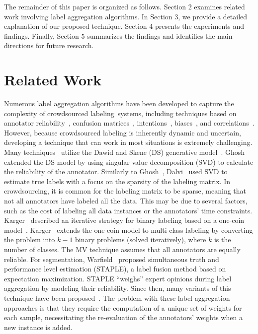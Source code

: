 The remainder of this paper is organized as follows. Section 2 examines related work involving label aggregation algorithms. In Section 3, we provide a detailed explanation of our proposed technique. Section 4 presents the experiments and findings. Finally, Section 5 summarizes the findings and identifies the main directions for future research.

\section{Related Work}
Numerous label aggregation algorithms have been developed to capture the complexity of crowdsourced labeling~systems, including techniques based on annotator reliability~\cite{bi_Learning_2014,demartini_Zencrowd_2012}, confusion matrices~\cite{raykar_Learning_2010,zhang_Spectral_2014}, intentions~\cite{bi_Learning_2014,kurve_MultiCategory_2015}, biases~\cite{zhang_Imbalanced_2013,hernandez-gonzalez_Note_2019, welinder_Multidimensional_2010}, and correlations~\cite{ma_Gradient_2020}. However, because crowdsourced labeling is inherently dynamic and uncertain, developing a technique that can work in most situations is extremely challenging. Many techniques~\cite{liu_Variational_2012,karger_Budget_2014,raykar_Learning_2010,dalvi_Aggregating_2013,ghosh_Who_2011} utilize the Dawid and Skene (DS) generative model~\cite{dawid_Maximum_1979}. Ghosh~\cite{ghosh_Who_2011} extended the DS model by using singular value decomposition (SVD) to calculate the reliability of the annotator. Similarly to Ghosh~\cite{ghosh_Who_2011}, Dalvi~\cite{dalvi_Aggregating_2013} used SVD to estimate true labels with a focus on the sparsity of the labeling matrix. In crowdsourcing, it is common for the labeling matrix to be sparse, meaning that not all annotators have labeled all the data. This may be due to several factors, such as the cost of labeling all data instances or the annotators' time constraints. Karger~\cite{karger_Budget_2014} described an iterative strategy for binary labeling based on a one-coin model~\cite{ghosh_Who_2011}. Karger~\cite{karger_Budget_2014} extends the one-coin model to multi-class labeling by converting the problem into $k-1 $ binary problems (solved iteratively), where $k $ is the number of classes.
The MV technique assumes that all annotators are equally reliable. For segmentation, Warfield~\cite{warfield_Simultaneous_2004} proposed simultaneous truth and performance level estimation (STAPLE), a label fusion method based on expectation maximization. STAPLE ``weighs'' expert opinions during label aggregation by modeling their reliability. Since then, many variants of this technique have been proposed~\cite{winzeck_ISLES_2018,commowick_Objective_2018,asman_Robust_2011,asman_Formulating_2012, eugenioiglesias_Unified_2013, jorgecardoso_STEPS_2013,asman_NonLocal_2013,akhondi-asl_Logarithmic_2014}. The problem with these label aggregation approaches is that they require the computation of a unique set of weights for each sample, necessitating the re-evaluation of the annotators' weights when a new instance is added.
